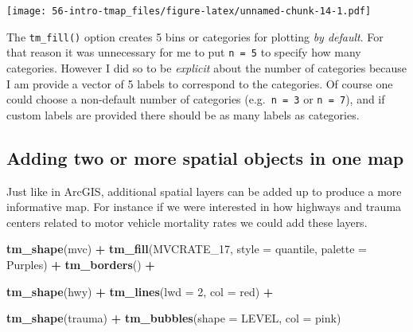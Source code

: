 \documentclass[
]{book}
\newenvironment{Shaded}{\begin{snugshade}}{\end{snugshade}}
\newcommand{\AttributeTok}[1]{\textcolor[rgb]{0.13,0.29,0.53}{#1}}
\newcommand{\DecValTok}[1]{\textcolor[rgb]{0.00,0.00,0.81}{#1}}
\newcommand{\FunctionTok}[1]{\textcolor[rgb]{0.13,0.29,0.53}{\textbf{#1}}}
\newcommand{\NormalTok}[1]{#1}
\newcommand{\SpecialCharTok}[1]{\textcolor[rgb]{0.81,0.36,0.00}{\textbf{#1}}}
\newcommand{\StringTok}[1]{\textcolor[rgb]{0.31,0.60,0.02}{#1}}
\newenvironment{rmdnote}[1]
  {
  \begin{itemize}
  \renewcommand{\labelitemi}{
    \raisebox{-.7\height}[0pt][0pt]{
      {\setkeys{Gin}{width=3em,keepaspectratio}\texttt{[image: images/\#1]}}
    }
  }
  \setlength{\fboxsep}{1em}
  \begin{note}
  \item
  }
  {
  \end{note}
  \end{itemize}
  }
\begin{document}
\texttt{[image: 56-intro-tmap\_files/figure-latex/unnamed-chunk-14-1.pdf]}

\begin{rmdnote}{note}
The \texttt{tm\_fill()} option creates 5 bins or categories for plotting \emph{by default}. For that reason it was unnecessary for me to put \texttt{n\ =\ 5} to specify how many categories. However I did so to be \emph{explicit} about the number of categories because I am provide a vector of 5 labels to correspond to the categories. Of course one could choose a non-default number of categories (e.g.~\texttt{n\ =\ 3} or \texttt{n\ =\ 7}), and if custom labels are provided there should be as many labels as categories.

\end{rmdnote}

\hypertarget{adding-two-or-more-spatial-objects-in-one-map}{%
\subsection{Adding two or more spatial objects in one map}\label{adding-two-or-more-spatial-objects-in-one-map}}

Just like in ArcGIS, additional spatial layers can be added up to produce a more informative map. For instance if we were interested in how highways and trauma centers related to motor vehicle mortality rates we could add these layers.

\begin{Shaded}
\begin{Highlighting}[]
\FunctionTok{tm\_shape}\NormalTok{(mvc) }\SpecialCharTok{+} 
  \FunctionTok{tm\_fill}\NormalTok{(}\StringTok{\textquotesingle{}MVCRATE\_17\textquotesingle{}}\NormalTok{,}
          \AttributeTok{style =} \StringTok{\textquotesingle{}quantile\textquotesingle{}}\NormalTok{,}
          \AttributeTok{palette =} \StringTok{\textquotesingle{}Purples\textquotesingle{}}\NormalTok{) }\SpecialCharTok{+}
  \FunctionTok{tm\_borders}\NormalTok{() }\SpecialCharTok{+}

\FunctionTok{tm\_shape}\NormalTok{(hwy) }\SpecialCharTok{+} 
  \FunctionTok{tm\_lines}\NormalTok{(}\AttributeTok{lwd =} \DecValTok{2}\NormalTok{, }\AttributeTok{col =} \StringTok{\textquotesingle{}red\textquotesingle{}}\NormalTok{) }\SpecialCharTok{+}
  
\FunctionTok{tm\_shape}\NormalTok{(trauma) }\SpecialCharTok{+} 
  \FunctionTok{tm\_bubbles}\NormalTok{(}\AttributeTok{shape =} \StringTok{\textquotesingle{}LEVEL\textquotesingle{}}\NormalTok{,}
             \AttributeTok{col =} \StringTok{\textquotesingle{}pink\textquotesingle{}}\NormalTok{)}
\end{Highlighting}
\end{Shaded}
\end{document}
